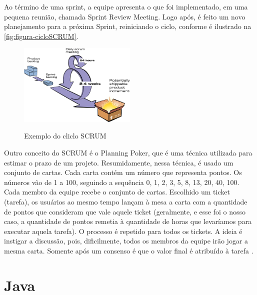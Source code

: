 Ao término de uma sprint, a equipe apresenta o que foi implementado, em uma pequena reunião, chamada Sprint Review Meeting. Logo após, é feito um novo planejamento para a próxima Sprint, reiniciando o ciclo, conforme é ilustrado na \autoref{fig:figura-cicloSCRUM}.

\begin{figure}[!htb]
    \centering
    \caption{Exemplo do cliclo SCRUM}
    \includegraphics[width=0.5\textwidth]{./dados/figuras/cicloSCRUM}
    \label{fig:figura-cicloSCRUM}
\end{figure}

Outro conceito do SCRUM é o Planning Poker, que é uma técnica utilizada para estimar o prazo de um projeto. Resumidamente, nessa técnica, é usado um conjunto de cartas. Cada carta contém um número que representa pontos. Os números vão de 1 a 100, seguindo a sequência 0, 1, 2, 3, 5, 8, 13, 20, 40, 100. Cada membro da equipe recebe o conjunto de cartas. Escolhido um ticket (tarefa), os usuários ao mesmo tempo lançam à mesa a carta com a quantidade de pontos que consideram que vale aquele ticket (geralmente, e esse foi o nosso caso, a quantidade de pontos remetia à quantidade de horas que levaríamos para executar aquela tarefa). O processo é repetido para todos os tickets. A ideia é instigar a discussão, pois, dificilmente, todos os membros da equipe irão jogar a mesma carta. Somente após um consenso é que o valor final é atribuído à tarefa \cite{Sabbagh2014}.

\section{Java}
\label{sec:embasamentoTeoricoJava}

